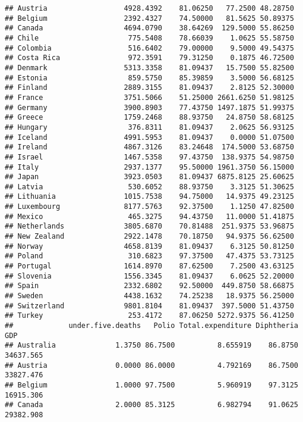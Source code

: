 \documentclass[
]{article}
\begin{document}
\begin{verbatim}
## Austria                  4928.4392    81.06250   77.2500 48.28750
## Belgium                  2392.4327    74.50000   81.5625 50.89375
## Canada                   4694.0790    38.64269  129.5000 55.86250
## Chile                     775.5408    78.66039    1.0625 55.58750
## Colombia                  516.6402    79.00000    9.5000 49.54375
## Costa Rica                972.3591    79.31250    0.1875 46.72500
## Denmark                  5313.3358    81.09437   15.7500 55.82500
## Estonia                   859.5750    85.39859    3.5000 56.68125
## Finland                  2889.3155    81.09437    2.8125 52.30000
## France                   3751.5066    51.25000 2661.6250 51.98125
## Germany                  3900.8903    77.43750 1497.1875 51.99375
## Greece                   1759.2468    88.93750   24.8750 58.68125
## Hungary                   376.8311    81.09437    2.0625 56.93125
## Iceland                  4991.5953    81.09437    0.0000 51.07500
## Ireland                  4867.3126    83.24648  174.5000 53.68750
## Israel                   1467.5358    97.43750  138.9375 54.98750
## Italy                    2937.1377    95.50000 1961.3750 56.15000
## Japan                    3923.0503    81.09437 6875.8125 25.60625
## Latvia                    530.6052    88.93750    3.3125 51.30625
## Lithuania                1015.7538    94.75000   14.9375 49.23125
## Luxembourg               8177.5763    92.37500    1.1250 47.82500
## Mexico                    465.3275    94.43750   11.0000 51.41875
## Netherlands              3805.6870    70.81488  251.9375 53.96875
## New Zealand              2922.1478    70.18750   94.9375 56.62500
## Norway                   4658.8139    81.09437    6.3125 50.81250
## Poland                    310.6823    97.37500   47.4375 53.73125
## Portugal                 1614.8970    87.62500    7.2500 43.63125
## Slovenia                 1556.3345    81.09437    6.0625 52.20000
## Spain                    2332.6802    92.50000  449.8750 58.66875
## Sweden                   4438.1632    74.25238   18.9375 56.25000
## Switzerland              9801.8104    81.09437  397.5000 51.43750
## Turkey                    253.4172    87.06250 5272.9375 56.41250
##             under.five.deaths   Polio Total.expenditure Diphtheria       GDP
## Australia              1.3750 86.7500          8.655919    86.8750 34637.565
## Austria                0.0000 86.0000          4.792169    86.7500 33827.476
## Belgium                1.0000 97.7500          5.960919    97.3125 16915.306
## Canada                 2.0000 85.3125          6.982794    91.0625 29382.908

\end{verbatim}
\end{document}
